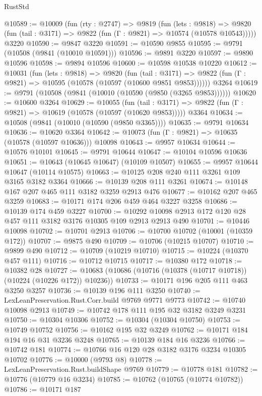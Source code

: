 \begin{lexlean}{RustStd}
\begin{coremodule}
@10589 := @10009
    (fun (rty : @2747) =>
    @9819
      (fun (lets : @9818) =>
      @9820 (fun (tail : @3171) => @9822 (fun (Γ : @9821) => @10574 (@10578 @10543)))))
    @3220
@10590 := @9847 @3220
@10591 := @10590 @9855
@10595 := @9791 (@10508 (@9841 (@10010 @10591)))
@10596 := @9891 @3220
@10597 := @9890 @10596
@10598 := @9894 @10596
@10600 := @10598 @10538 @10220
@10612 := @10031
    (fun (lets : @9818) =>
    @9820
      (fun (tail : @3171) =>
      @9822 (fun (Γ : @9821) => @10595 (@10578 (@10597 (@10600 @9851 @9853))))))
    @3264
@10619 := @9791 (@10508 (@9841 (@10010 (@10590 (@9850 (@3265 @9853))))))
@10620 := @10600 @3264
@10629 := @10055
    (fun (tail : @3171) => @9822 (fun (Γ : @9821) => @10619 (@10578 (@10597 (@10620 @9853)))))
    @3364
@10634 := @10508 (@9841 (@10010 (@10590 (@9850 @3365))))
@10635 := @9791 @10634
@10636 := @10620 @3364
@10642 := @10073 (fun (Γ : @9821) => @10635 (@10578 (@10597 @10636))) @10098
@10643 := @9957 @10634
@10644 := @10576 @10101
@10645 := @9791 @10644
@10647 := @10104 @10596 @10636
@10651 := @10643 (@10645 @10647) (@10109 @10507)
@10655 := @9957 @10644 @10647 (@10114 @10575)
@10663 := @10125 @208 @240 @111 @3261 @109 @3165 @3182 @3364
@10666 := @10139 @208 @111 @3261
@10674 := @10148 @167 @207 @465 @111 @3182 @3259 @2913 @476
@10677 := @10162 @207 @465 @3259
@10683 := @10171 @174 @206 @459 @464 @3227 @3258
@10686 := @10139 @174 @459 @3227
@10700 := @10292 @10098 @2913 @172 @120 @28 @457 @111 @3182 @3176 @10305 @109 @2913 @2913 @490
@10701 := @10446 @10098
@10702 := @10701 @2913
@10706 := @10700 @10702 (@10001 (@10359 @172))
@10707 := @9875 @490
@10709 := @10706 (@10215 @10707)
@10710 := @9899 @490
@10712 := @10709 (@10219 @10710)
@10715 := @10224 (@10370 @457 @111)
@10716 := @10712 @10715
@10717 := @10380 @172
@10718 := @10382 @28
@10727 := @10683 (@10686 (@10716 (@10378 (@10717 @10718)) (@10224 (@10226 @172)) @10236))
@10733 := @10171 @196 @205 @111 @463 @3250 @3257
@10736 := @10139 @196 @111 @3250
@10740 := LexLeanPreservation.Rust.Corr.build @9769 @9771 @9773
@10742 := @10740 @10098 @2913
@10749 := @10742 @178 @111 @195 @32 @3182 @3249 @3231
@10750 := @10304 @10306
@10752 := @10304 (@10304 @10750)
@10753 := @10749 @10752
@10756 := @10162 @195 @32 @3249
@10762 := @10171 @184 @194 @16 @31 @3236 @3248
@10765 := @10139 @184 @16 @3236
@10766 := @10742 @181
@10774 := @10766 @16 @120 @28 @3182 @3176 @3234 @10305 @10702
@10776 := @10000 (@9793 @8)
@10778 := LexLeanPreservation.Rust.buildShape @9769
@10779 := @10778 @181
@10782 := @10776 (@10779 @16 @3234)
@10785 := @10762 (@10765 (@10774 @10782))
@10786 := @10171 @187

\end{coremodule}
\end{lexlean}
